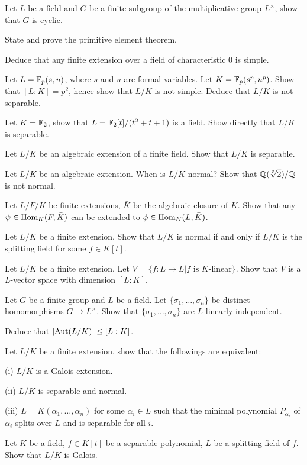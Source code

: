 \begin{question}{21}
    Let $L$ be a field and $G$ be a finite subgroup of the multiplicative group $L^{\times}$, show that $G$ is cyclic.

    State and prove the primitive element theorem.

    Deduce that any finite extension over a field of characteristic $0$ is simple.
\end{question}

\begin{question}{22}
    Let $L = \mathbb{F}_p(s,u)$, where $s$ and $u$ are formal variables. Let $K = \mathbb{F}_p(s^p,u^p)$. Show that $[L:K] = p^2$, hence show that $L/K$ is not simple. Deduce that $L/K$ is not separable.

    Let $K = \mathbb{F}_2$, show that $L = \mathbb{F}_2[t]/(t^2 + t + 1)$ is a field. Show directly that $L/K$ is separable.

    Let $L/K$ be an algebraic extension of a finite field. Show that $L/K$ is separable.
\end{question}

\begin{question}{23}
    Let $L/K$ be an algebraic extension. When is $L/K$ normal? Show that $\mathbb{Q}(\sqrt[3]{2})/\mathbb{Q}$ is not normal.

    Let $L/F/K$ be finite extensions, $\bar K$ be the algebraic closure of $K$. Show that any $\psi \in \text{Hom}_K(F,\bar K)$ can be extended to $\phi \in \text{Hom}_K(L,\bar K)$.

    Let $L/K$ be a finite extension. Show that $L/K$ is normal if and only if $L/K$ is the splitting field for some $f \in K[t]$.
\end{question}

\begin{question}{23.5}
	Let $L/K$ be a finite extension. Let $V = \{f:L\rightarrow L| f \text{ is } K \text{-linear}\}$. Show that $V$ is a $L$-vector space with dimension $[L:K]$. 
	
	Let $G$ be a finite group and $L$ be a field. Let $\{\sigma_1,\dots,\sigma_n\}$ be distinct homomorphisms $G \rightarrow L^\times$. Show that $\{\sigma_1,\dots,\sigma_n\}$ are $L$-linearly independent.
	
	Deduce that $|\text{Aut}(L/K)| \leq [L:K]$.
\end{question}

\begin{question}{24}
    Let $L/K$ be a finite extension, show that the followings are equivalent:

    (i) $L/K$ is a Galois extension.

    (ii) $L/K$ is separable and normal.

    (iii) $L = K(\alpha_1,\dots,\alpha_n)$ for some $\alpha_i \in L$ such that the minimal polynomial $P_{\alpha_i}$ of $\alpha_i$ splits over $L$ and is separable for all $i$.

    Let $K$ be a field, $f \in K[t]$ be a separable polynomial, $L$ be a splitting field of $f$. Show that $L/K$ is Galois.
\end{question}

